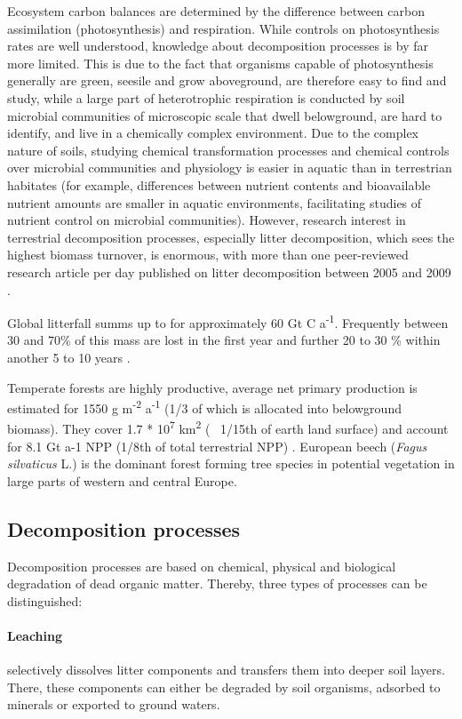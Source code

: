 Ecosystem carbon balances are determined by the difference between carbon assimilation (photosynthesis) and respiration. While controls on photosynthesis rates are well understood, knowledge about decomposition processes is by far more limited. This is due to the fact that organisms capable of photosynthesis generally are green, seesile and grow aboveground, are therefore easy to find and study, while a large part of heterotrophic respiration is conducted by soil microbial communities of microscopic scale that dwell belowground, are  hard to identify, and live in a chemically complex environment. Due to the complex nature of soils, studying chemical transformation processes and chemical controls over microbial communities and physiology is easier in aquatic than in terrestrian habitates (for example, differences between nutrient contents and bioavailable nutrient amounts are smaller in aquatic environments, facilitating studies of nutrient control on microbial communities). However, research interest in terrestrial decomposition processes, especially litter decomposition, which sees the highest biomass turnover, is enormous, with more than one peer-reviewed research article per day published on litter decomposition between 2005 and 2009 \citep{Prescott2010}. 

Global litterfall summs up to for approximately 60 Gt C a\textsuperscript{-1}. Frequently between 30 and 70\% of this mass are lost in the first year and further 20 to 30 \% within another 5 to 10 years \citep[p.157]{Chapin2002}.

Temperate forests are highly productive, average net primary production is estimated for 1550 g m\textsuperscript{-2} a\textsuperscript{-1} (1/3 of which is allocated into belowground biomass). They cover 1.7 * 10\textsuperscript{7} km\textsuperscript{2} (~ 1/15th of earth land surface) and account for 8.1 Gt a-1 NPP (1/8th of total terrestrial NPP) \citep[p?]{Chapin2002}. European beech (\emph{Fagus silvaticus} L.) is the dominant forest forming tree species in potential vegetation in large parts of western and central Europe. 

\subsection{Decomposition processes}
Decomposition processes are based on chemical, physical and biological degradation of dead organic matter. Thereby, three types of processes can be distinguished:
\paragraph{Leaching} selectively dissolves litter components and transfers them into deeper soil layers. There, these components can either be degraded by soil organisms, adsorbed to minerals or exported to ground waters. 
